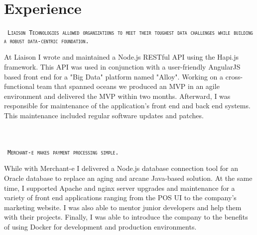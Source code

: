 \documentclass{muratcan_cv}
\begin{document}
\headerview
\vspace{1ex}
%
%
\section{Experience}
    \mbox { \scshape \hspace{1.2em} \tiny{\texttt{Liaison Technologies allowed organizations
     to meet their toughest data challenges while building a robust data-centric foundation.}}}\\
    \indent \indent \begin{minipage}{0.96\linewidth} \footnotesize
     At Liaison I wrote and maintained a Node.js RESTful API using the Hapi.js framework. This API was used in conjunction with a user-friendly AngularJS based front end for a "Big Data" platform named "Alloy". Working on a cross-functional team that spanned oceans we produced an MVP in an agile environment and delivered the MVP within two months. Afterward, I was responsible for maintenance of the application's front end and back end systems. This maintenance included regular software updates and patches.
    \end{minipage} \\[0.1cm]\\
    \mbox { \scshape \hspace{1.2em} \tiny{\texttt{Merchant-e makes payment processing simple.}}}\\
    \indent \indent \begin{minipage}{0.96\linewidth} \footnotesize
     While with Merchant-e I delivered a Node.js database connection tool for an Oracle database to replace an aging and arcane Java-based solution. At the same time, I supported Apache and nginx server upgrades and maintenance for a variety of front end applications ranging from the POS UI to the company's marketing website. I was also able to mentor junior developers and help them with their projects. Finally, I was able to introduce the company to the benefits of using Docker for development and production environments.
    \end{minipage} \\[0.1cm]\\
\end{document}
